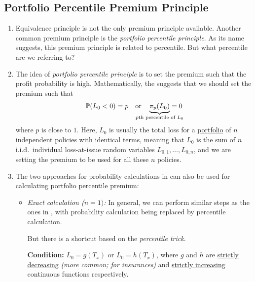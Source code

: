 \subsection{Portfolio Percentile Premium Principle}
\begin{enumerate}
\item Equivalence principle is not the only premium principle available.
Another common premium principle is the \emph{portfolio percentile principle}.
As its name suggests, this premium principle is related to percentile. But what
percentile are we referring to?

\item The idea of \emph{portfolio percentile principle} is to set the premium
such that the profit probability is high. Mathematically, the  suggests that we should set the premium such that
\[\prob{L_0<0}=p\qqtext{or} \underbrace{\pi_{p}(L_0)}_{\mathclap{\text{\(p\)th
percentile of \(L_0\)}}}=0\]
where \(p\) is close to \(1\). Here, \(L_0\) is usually the total loss for a
\underline{portfolio} of \(n\) independent policies with identical terms,
meaning that \(L_0\) is the sum of \(n\) i.i.d.\ individual loss-at-issue random
variables \(L_{0,1},\dotsc,L_{0,n}\), and we are setting the premium to be
used for all these \(n\) policies.

\item \label{it:port-percen-approaches} The two approaches for probability
calculations in  can also be used for calculating
portfolio percentile premium:
\begin{itemize}
\item \emph{Exact calculation (\(n=1)\):} In general, we can perform similar
steps as the ones in , with probability
calculation being replaced by percentile calculation.

But there is a shortcut based on the \emph{percentile trick}.

\textbf{Condition:} \(L_0=g(T_x)\) or \(L_0=h(T_x)\), where \(g\) and \(h\) are
\underline{strictly decreasing} \emph{(more common; for insurances)} and
\underline{strictly increasing} continuous functions respectively.


\end{itemize}
\end{enumerate}
